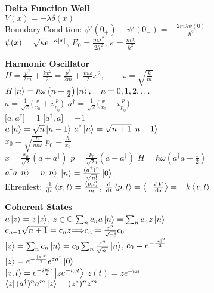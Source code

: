 \documentclass[11pt, a4paper]{article}
\newcommand{\newsec}[1]{\vspace{2mm}\textbf{#1}\\}
\let\spaceyimplies\implies
\renewcommand{\implies}{\hspace{-1mm}\spaceyimplies\hspace{-1mm}}
\begin{document}
\begin{multicols}{2}
\newsec{Delta Function Well}
$ V(x) = -\lambda \delta (x) $\\
Boundary Condition: $ \psi'(0_{+}) - \psi'(0_{-}) = -\frac{2m\lambda\psi(0)}{\hbar^{2}} $\\
$ \psi(x) = \sqrt{\kappa} e^{-\kappa \abs{x}} $, \quad $ E_{0} = \frac{m\lambda^{2}}{2\hbar^{2}} $, \quad $ \kappa = \frac{m\lambda}{\hbar^{2}} $



\newsec{Harmonic Oscillator}
$ H = \frac{p^{2}}{2m} + \frac{kx^{2}}{2} = \frac{p^{2}}{2m} + \frac{m\omega}{2}x^{2}, \qquad \omega = \sqrt{\frac{k}{m}} $\\
$ H \ket{n} = \hbar \omega \left(n + \frac{1}{2}\right)\ket{n}, \quad n = 0, 1, 2, \ldots $\\
$ a = \frac{1}{\sqrt{2}}\big(\frac{x}{x_{0}} + i\frac{p}{p_{0}}\big) $ \qquad  $\, a^{\dagger} = \frac{1}{\sqrt{2}}\big(\frac{x}{x_{0}} - i\frac{p}{p_{0}}\big) $\\
$ \big[a, a^{\dagger}\big] = 1 $ \qquad \qquad  \quad $ \big[ a^{\dagger}, a\big] = -1 $\\
$ a\ket{n} = \sqrt{n}\ket{n-1} $ \qquad $ a^{\dagger} \ket{n} = \sqrt{n + 1} \ket{n+1} $ \\
$ x_{0} = \sqrt{\frac{\hbar}{m\omega}} $ \qquad $ p_{0} = \frac{\hbar}{x_{0}} $\\
$ x = \frac{x_{0}}{\sqrt{2}}(a + a^{\dagger}) $ \quad $ p = \frac{p_{0}}{\sqrt{2}i}(a - a^{\dagger}) $ \quad $ H = \hbar \omega\left (a^{\dagger}a + \frac{1}{2}\right ) $\\
$ a^{\dagger}a \ket{n} = n \ket{n}$ \qquad $ \ket{n} = \frac{(a^{\dagger})^{n}}{\sqrt{n!}} \ket{0} $\\
Ehrenfest: $ \dv{t}\ev{x, t} = \frac{\ev{p, t}}{m} $,  $\dv{t}\ev{p, t} = \ev{-\dv{V}{x}} = -k\ev{x, t} $



\newsec{Coherent States}
$ a \ket{z} = z \ket{z} $, $ z \in \mathbb{C} $ \qquad $ \sum_{n} c_{n} a \ket{n} = \sum_{n} c_{n} z \ket{n} $\\
$ c_{n+1}\sqrt{n+1} = c_{n}z \implies c_{n} = \frac{z^{n}}{\sqrt{n!}}c_{0} $\\
$ \ket{z} = \sum_{n}c_{n} \ket{n} = c_{0} \sum_{n} \frac{z^{n}}{\sqrt{n!}}\ket{n} $, \quad $ c_{0} = e^{-\frac{\abs{z}^{2}}{2}} $\\
$ \ket{z} =  e^{-\frac{\abs{z}^{2}}{2}}  e^{za^{\dagger}} \ket{0} $\\
$ \ket{z, t} = e^{-i \frac{\omega}{2}t} \ket{z e^{-i\omega t}} $ \qquad $ z(t) = ze^{-i\omega t} $\\
$ \bra{z}(a^{\dagger})^{n}a^{m}\ket{z} = (z^{*})^{n}z^{m} $


\end{multicols}
\end{document}
